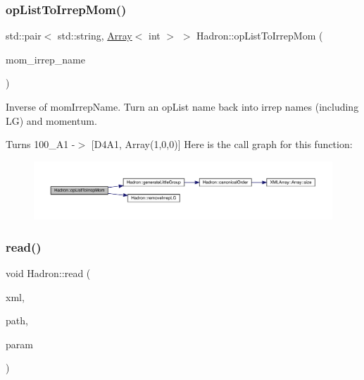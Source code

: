 \subsubsection{\texorpdfstring{opListToIrrepMom()}{opListToIrrepMom()}}
{\footnotesize\ttfamily std\+::pair$<$ std\+::string, \mbox{\hyperlink{classXMLArray_1_1Array}{Array}}$<$ int $>$ $>$ Hadron\+::op\+List\+To\+Irrep\+Mom (\begin{DoxyParamCaption}\item[{const std\+::string \&}]{mom\+\_\+irrep\+\_\+name }\end{DoxyParamCaption})}



Inverse of mom\+Irrep\+Name. Turn an op\+List name back into irrep names (including LG) and momentum. 

Turns 100\+\_\+\+A1 -\/$>$ \mbox{[}D4\+A1, Array(1,0,0)\mbox{]} Here is the call graph for this function\+:
\nopagebreak
\begin{figure}[H]
\begin{center}
\leavevmode
\includegraphics[width=350pt]{d1/daf/namespaceHadron_a8bd515c92e3dbbe8e9741b25d71edc60_cgraph}
\end{center}
\end{figure}
\mbox{\label{namespaceHadron_ae9e95e7c9b97a878e77c48ea5619a53a}} 
\subsubsection{\texorpdfstring{read()}{read()}\hspace{0.1cm}{\footnotesize\ttfamily [1/94]}}
{\footnotesize\ttfamily void Hadron\+::read (\begin{DoxyParamCaption}\item[{\mbox{\hyperlink{classADATXML_1_1XMLReader}{X\+M\+L\+Reader}} \&}]{xml,  }\item[{const std\+::string \&}]{path,  }\item[{\mbox{\hyperlink{structHadron_1_1HadronNptType__t}{Hadron\+Npt\+Type\+\_\+t}} \&}]{param }\end{DoxyParamCaption})}

